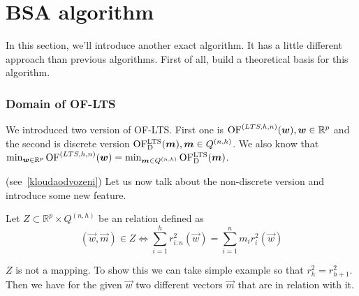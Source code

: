 







\section{BSA algorithm} \label{bsasection}
In this section, we'll introduce another exact algorithm. It has a little different approach than previous algorithms. First of all, build a theoretical basis for this algorithm.



\subsubsection{Domain of OF-LTS}
We introduced two version of OF-LTS. First one is 
$\operatorname{OF}^{(LTS,h, n)}(\boldsymbol{w}), \boldsymbol{w} \in \mathbb{R}^p$ and the second is discrete version 
$\operatorname{OF^{LTS}_D}(\boldsymbol{m}), \boldsymbol{m} \in Q^{(n,h)}$. 
We also know that 
$\operatorname*{min}_{\boldsymbol{w} \in \mathbb{R}^p} \operatorname{OF}^{(LTS,h, n)}(\boldsymbol{w})  =  \operatorname*{min}_{\boldsymbol{m} \in Q^{(n,h)}} \operatorname{OF^{LTS}_D}(\boldsymbol{m})$.

 (see~\eqref{kloudaodvozeni}) Let us now talk about the non-discrete version and introduce some new feature.

\begin{definition}
    Let $Z \subset \mathbb{R}^p \times  Q^{(n,h)}$ be an relation defined as
    \begin{equation}
        (\vec{w}, \vec{m}) \in Z \Leftrightarrow \sum\limits_{i=1}^h r_{i:n}^2(\vec{w}) = \sum\limits_{i=1}^n m_i r_{i}^2(\vec{w})
    \end{equation}
\end{definition}


$Z$ is not a mapping. To show this we can take simple example so that $r^{2}_{h} = r^{2}_{h+1}$. Then we have for the given $\vec{w}$ two different vectors $\vec{m}$ that are in relation with it.

